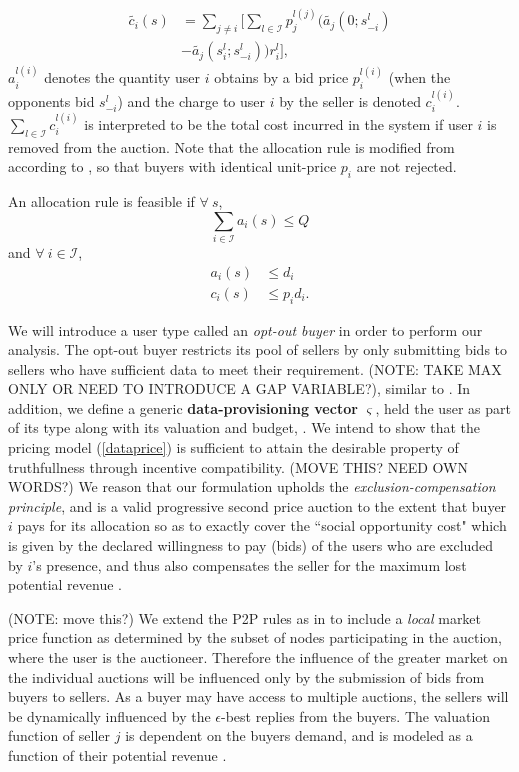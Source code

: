 \documentclass[12pt]{article}
\theoremstyle{definition}
\newcommand{\vs}{\varsigma}
\newcommand{\mcI}{\mathcal{I}}
\begin{document}
\begin{multicols}{2}
\begin{align*}
    \tilde{c_i}(s) &= \displaystyle\sum_{j\ne i}\bigg\lbrack\sum_{l\in\mcI}
p_j^{l(j)} \bigg(\tilde{a_j}(0; s_{-i}^l)\\
    &-\tilde{a_j}(s_i^l;s_{-i}^l)\bigg) r_i^l\bigg\rbrack,
\end{align*}
 $a_i^{l(i)}$ denotes the quantity user $i$ obtains by a bid price
$p_i^{l(i)}$ (when the
opponents bid $s_{−i}^l$) and the charge to user $i$ by the seller is denoted
$c_i^{l(i)}$. $\sum_{l\in\mcI} c_i^{l(i)}$ is interpreted to be the total cost incurred in the system if
user $i$ is removed from the auction. Note that the allocation rule is modified
from \cite{lazar} according to \cite{tuffin}, so that buyers with identical unit-price
$p_i$ are not rejected.

An allocation rule is feasible \cite{lazar} if $\forall \ s$,
$$
    \displaystyle\sum_{i\in\mcI} a_i(s) \le Q
$$
and $\forall \ i\in\mcI$,
\begin{align*}
    a_i(s) &\le d_i \\
    c_i(s) &\le p_id_i.
\end{align*}

We will introduce a user type called an \emph{opt-out buyer} in order to perform our analysis. The
opt-out buyer restricts its pool of sellers by only submitting bids to sellers
who have sufficient data to meet their requirement.
(NOTE: TAKE MAX ONLY OR NEED TO INTRODUCE
A GAP VARIABLE?), similar to \cite{zheng}. 
In addition, we define a generic
\textbf{data-provisioning vector} $\vs$, held the user as part of its type
along with its valuation and budget, . 
We intend to show that the pricing model (\ref{dataprice}) is sufficient to attain the desirable
property of truthfullness through incentive compatibility. (MOVE THIS? NEED OWN
WORDS?) We
reason that our formulation upholds the \emph{exclusion-compensation
principle}, and is a valid progressive second price auction to the extent that buyer $i$
pays for its allocation so as to exactly cover the ``social opportunity cost" which is given by the declared willingness to pay (bids) of the users who are excluded by $i$'s
presence, and thus also compensates the seller for the maximum lost potential
revenue \cite{lazar}.

(NOTE: move this?)
We extend the P2P rules as in \cite{semret} to include a \emph{local} market
price function as determined by the subset of nodes participating in the
auction, where the user is the auctioneer. Therefore the influence of the greater market on the individual
auctions will be influenced only by the submission of bids from buyers to
sellers. As a buyer may have access to multiple auctions, the sellers will be
dynamically influenced by the $\epsilon$-best replies from the buyers. The
valuation function of seller $j$ is dependent on the buyers demand, and is
modeled as a function of their potential revenue \cite{semret}. 


\end{multicols}
\end{document}
